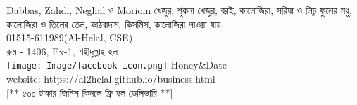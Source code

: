 \documentclass[a4paper,12pt]{article}
\begin{document}
\centering
{}
{
\begin{minipage}{0.43\textwidth}
 Dabbas, Zahdi, Neghal  ও Moriom খেজুর, শুকনা খেজুর, বরই, কালোজিরা, সরিষা ও  লিচু ফুলের মধু, কালোজিরা ও তিলের তেল, কাঠবাদাম, কিসমিস, কালোজিরা পাওয়া যায়\\01515-611989(Al-Helal, CSE)\\
রুম - 1406, Ex-1, শহীদুল্লাহ হল\\
\texttt{[image: Image/facebook-icon.png]} Honey\&Date\\ website: https://al2helal.github.io/business.html\\ [** ৫০০ টাকার জিনিস কিনলে ফ্রি হল ডেলিভারি **]
\end{minipage}\vspace{0.3cm}
}
\end{document}
